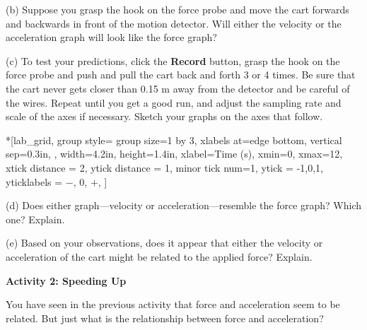 
\newpage
(b) Suppose you grasp the hook on the force probe and move the cart forwards
and backwards in front of the motion detector. Will either the
velocity or the acceleration graph will look like the force graph? 
\answerspace{8mm}

\pagebreak[3]
(c) To test your predictions, click the \textbf{Record} button, grasp the
hook on the force probe and push and pull the cart back and forth 3 or 4 times. Be sure that
the cart never gets closer than 0.15 m away from the detector and be careful
of the wires. Repeat until you get a good run, and adjust the sampling rate 
and scale of the axes if necessary. Sketch your graphs on the axes that follow.


\begin{lab_groupplot}*{}[lab_grid,
	group style={
		group size=1 by 3,
		xlabels at=edge bottom,
		vertical sep=0.3in,
		},
	width=4.2in,  height=1.4in,
	xlabel=Time (s),
	xmin=0, xmax=12,
	xtick distance = 2, 
	ytick distance = 1, 
	minor tick num=1,
	ytick = {-1,0,1},
	yticklabels = {$-$, 0, $+$},
	]
\nextgroupplot[
	ymin=-1,ymax=1, 
	ylabel={Velocity (m/s)},
	]
\nextgroupplot[
	ymin=-1,ymax=1, 
	ylabel={Acceleration (m/s$^2$)},
	]
\nextgroupplot[
	ymin=-1,ymax=1, 
	ylabel={Force (N)},
	]
\end{lab_groupplot}

(d) Does either graph---velocity or acceleration---resemble the force graph? Which
one? Explain.
\answerspace{10mm}

(e) Based on your observations, does it appear that either the velocity or acceleration
of the cart might be related to the applied force? Explain.
\answerspace{10mm}

\pagebreak[3]
\textbf{Activity 2: Speeding Up }

You have seen in the previous activity that force and acceleration seem to be
related. But just what is the relationship between force and acceleration? 

